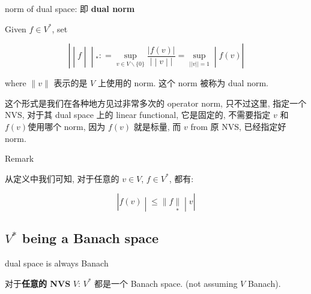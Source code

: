 \documentclass{qlnotes-export}
\begin{document}
\begin{definition}{norm of dual space: 即 \textbf{dual norm}}\label{def-13-the-dual-of-l-p-spaces-norm-of-dual-space-dual-norm}

Given \(f \in V^{\ast}\), set

\[\left. | \middle| f \middle| \middle| {}_{\ast}: = \sup\limits_{v \in V\backslash{\{ 0\}}}\frac{|f(v)|}{\left. | \middle| v \middle| | \right.} = \sup\limits_{||v|| = 1} \middle| f(v)| \right.\]

where \(\parallel v \parallel\) 表示的是 \(V\) 上使用的 norm. 这个 norm 被称为 dual norm.

\end{definition}

这个形式是我们在各种地方见过非常多次的{ }\textbf{} operator norm, 只不过这里, 指定一个 NVS, 对于其 dual space 上的 linear functional, 它是固定的, 不需要指定 \(v\) 和 \(f(v)\)使用哪个 norm, 因为 \(f(v)\) 就是标量, 而 \(v\) from 原 NVS, 已经指定好 norm.

\begin{qlremark}{Remark}

从定义中我们可知, 对于任意的 \(v \in V\), \(f \in V^{\ast}\), 都有:

\[\left. |f(v) \middle| \leq \parallel f\underset{\ast}{\parallel} \middle| v| \right.\]

\end{qlremark}

\subsection{\texorpdfstring{\(V^{\ast}\) being a Banach space}{V\^{}\{\textbackslash ast\} being a Banach space}}\label{vast-being-a-banach-space}

\begin{theorem}{dual space is always Banach}\label{thm-13-the-dual-of-l-p-spaces-dual-space-is-always-banach}

对于\textbf{任意的 NVS} \(V\): \(V^{\ast}\) 都是一个 Banach space. (not assuming \(V\) Banach).

\end{theorem}
\end{document}

